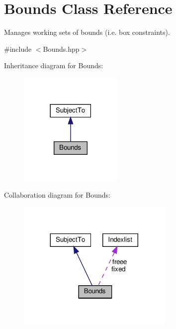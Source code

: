 \hypertarget{class_bounds}{}\section{Bounds Class Reference}
\label{class_bounds}


Manages working sets of bounds (i.\+e. box constraints).  




{\ttfamily \#include $<$Bounds.\+hpp$>$}



Inheritance diagram for Bounds\+:
\nopagebreak
\begin{figure}[H]
\begin{center}
\leavevmode
\includegraphics[width=141pt]{class_bounds__inherit__graph}
\end{center}
\end{figure}


Collaboration diagram for Bounds\+:
\nopagebreak
\begin{figure}[H]
\begin{center}
\leavevmode
\includegraphics[width=212pt]{class_bounds__coll__graph}
\end{center}
\end{figure}
